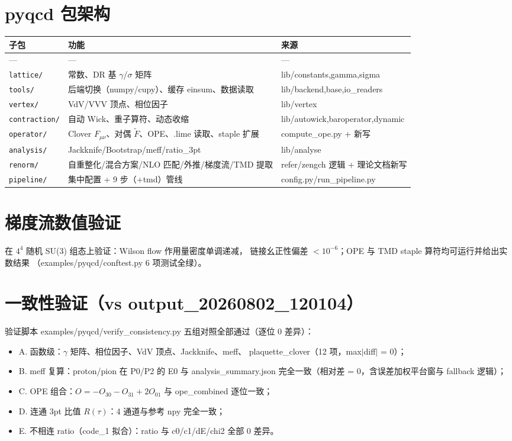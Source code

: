 \documentclass[12pt,a4paper]{ctexart}
\begin{document}
\section{pyqcd 包架构}

\begin{table}[H]
\centering
\begin{tabular}{lll}
\toprule
子包 & 功能 & 来源 \\
\midrule
--- & --- & --- \\
\texttt{lattice/} & 常数、DR 基 $\gamma$/$\sigma$ 矩阵 & lib/constants,gamma,sigma \\
\texttt{tools/} & 后端切换（numpy/cupy）、缓存 einsum、数据读取 & lib/backend,base,io\_readers \\
\texttt{vertex/} & VdV/VVV 顶点、相位因子 & lib/vertex \\
\texttt{contraction/} & 自动 Wick、重子算符、动态收缩 & lib/autowick,baroperator,dynamic \\
\texttt{operator/} & Clover $F_{\mu\nu}$、对偶 $\tilde F$、OPE、.lime 读取、staple 扩展 & compute\_ope.py + 新写 \\
\texttt{analysis/} & Jackknife/Bootstrap/meff/ratio\_3pt & lib/analyse \\
\texttt{renorm/} & 自重整化/混合方案/NLO 匹配/外推/梯度流/TMD 提取 & refer/zengch 逻辑 + 理论文档新写 \\
\texttt{pipeline/} & 集中配置 + 9 步（+tmd）管线 & config.py/run\_pipeline.py \\
\bottomrule
\end{tabular}
\end{table}
\section{梯度流数值验证}

在 $4^4$ 随机 SU(3) 组态上验证：Wilson flow 作用量密度单调递减，
链接幺正性偏差 $< 10^{-6}$；OPE 与 TMD staple 算符均可运行并给出实数结果
（examples/pyqcd/conftest.py 6 项测试全绿）。

\section{一致性验证（vs output\_20260802\_120104）}

验证脚本 examples/pyqcd/verify\_consistency.py 五组对照全部通过（逐位 0 差异）：

\begin{itemize}
  \item A. 函数级：$\gamma$ 矩阵、相位因子、VdV 顶点、Jackknife、meff、
        plaquette\_clover（12 项，max$|$diff$|$ = 0）；
  \item B. meff 复算：proton/pion 在 P0/P2 的 E0 与 analysis\_summary.json
        完全一致（相对差 = 0，含误差加权平台窗与 fallback 逻辑）；
  \item C. OPE 组合：$O = -O_{30} - O_{31} + 2O_{01}$ 与 ope\_combined 逐位一致；
  \item D. 连通 3pt 比值 $R(\tau)$：4 通道与参考 npy 完全一致；
  \item E. 不相连 ratio（code\_1 拟合）：ratio 与 c0/c1/dE/chi2 全部 0 差异。
\end{itemize}
\end{document}
